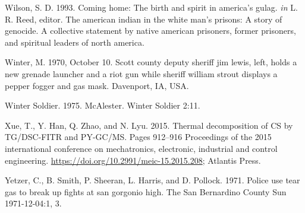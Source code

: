 \documentclass[
  11pt,
]{krantz}
\newlength{\cslhangindent}
\newlength{\cslentryspacingunit} %
\newenvironment{CSLReferences}[2] %
 {%
  \setlength{\parindent}{0pt}
  \ifodd #1
  \let\oldpar\par
  \def\par{\hangindent=\cslhangindent\oldpar}
  \fi
  \setlength{\parskip}{#2\cslentryspacingunit}
 }%
 {}
\begin{document}
\begin{CSLReferences}{1}{0}
\leavevmode{}%
Wilson, S. D. 1993. Coming home: The birth and spirit in america's gulag. \emph{in} L. R. Reed, editor. The american indian in the white man's prisons: A story of genocide. A collective statement by native american prisoners, former prisoners, and spiritual leaders of north america.

\leavevmode{}%
Winter, M. 1970, October 10. Scott county deputy sheriff jim lewis, left, holds a new grenade launcher and a riot gun while sheriff william strout displays a pepper fogger and gas mask. Davenport, IA, USA.

\leavevmode{}%
Winter Soldier. 1975. McAlester. Winter Soldier 2:11.

\leavevmode{}%
Xue, T., Y. Han, Q. Zhao, and N. Lyu. 2015. Thermal decomposition of CS by TG/DSC-FITR and PY-GC/MS. Pages 912--916 Proceedings of the 2015 international conference on mechatronics, electronic, industrial and control engineering. \url{https://doi.org/10.2991/meic-15.2015.208}; Atlantis Press.

\leavevmode{}%
Yetzer, C., B. Smith, P. Sheeran, L. Harris, and D. Pollock. 1971. Police use tear gas to break up fights at san gorgonio high. The San Bernardino County Sun 1971-12-04:1, 3.

\end{CSLReferences}

\printindex
\end{document}
